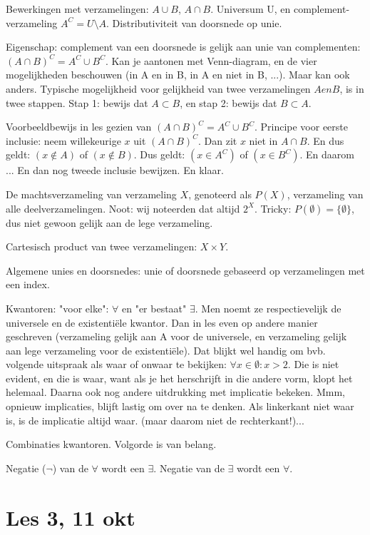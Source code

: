 \documentclass{article}
\begin{document}
Bewerkingen met verzamelingen: $A \cup B$, $A \cap B$. Universum U, en complement-verzameling $A^C = U \setminus A$. Distributiviteit van doorsnede op unie. 

Eigenschap: complement van een doorsnede is gelijk aan unie van complementen: $(A \cap B)^C = A^C \cup B^C$. Kan je aantonen met Venn-diagram, en de vier mogelijkheden beschouwen (in A en in B, in A en niet in B, ...). Maar kan ook anders. Typische mogelijkheid voor gelijkheid van twee verzamelingen $A en B$, is in twee stappen. Stap 1: bewijs dat $A \subset B$, en stap 2: bewijs dat $B \subset A$. 

Voorbeeldbewijs in les gezien van $(A \cap B)^C = A^C \cup B^C$. Principe voor eerste inclusie: neem willekeurige $x$ uit $(A \cap B)^C$. Dan zit  $x$ niet in $A \cap B$. En dus geldt: $(x\notin A)$ of $(x\notin B)$. Dus geldt: $(x \in A^C)$ of $(x\in B^C)$. En daarom ... En dan nog tweede inclusie bewijzen. En klaar. 

De machtsverzameling van verzameling $X$, genoteerd als $P(X)$, verzameling van alle deelverzamelingen. Noot: wij noteerden dat altijd $2^X$. Tricky: $P(\emptyset) = \{ \emptyset \}$, dus niet gewoon gelijk aan de lege verzameling. 

Cartesisch product van twee verzamelingen: $X \times Y$. 

Algemene unies en doorsnedes: unie of doorsnede gebaseerd op verzamelingen met een index. 

Kwantoren: "voor elke": $\forall$  en "er bestaat" $\exists$. Men noemt ze respectievelijk  de universele en de existenti\"ele kwantor. Dan in les even op andere manier geschreven (verzameling gelijk aan A voor de universele, en verzameling gelijk aan lege verzameling voor de existenti\"ele). Dat blijkt wel handig om bvb. volgende uitspraak als waar of onwaar te bekijken: $\forall x \in \emptyset : x>2$. Die is niet evident, en die is waar, want als je het herschrijft in die andere vorm, klopt het helemaal. 
Daarna ook nog andere uitdrukking met implicatie bekeken. Mmm, opnieuw implicaties, blijft lastig om over na te denken. Als linkerkant niet waar is, is de implicatie altijd waar. (maar daarom niet de rechterkant!)... 

Combinaties kwantoren. Volgorde is van belang. 

Negatie ($\lnot$) van de $\forall$ wordt een $\exists$. Negatie van de $\exists$ wordt een $\forall$. 


\section{Les 3, 11 okt}
\end{document}
